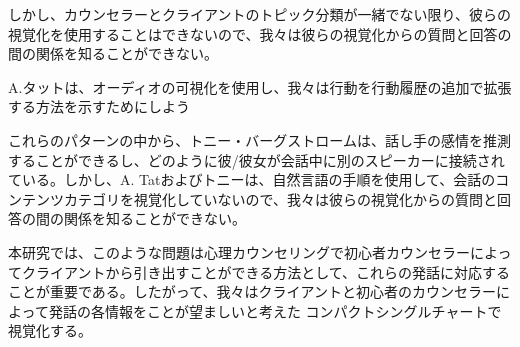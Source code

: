 \documentclass[shuuron]{kuee}
\begin{document}
しかし、カウンセラーとクライアントのトピック分類が一緒でない限り、彼らの視覚化を使用することはできないので、我々は彼らの視覚化からの質問と回答の間の関係を知ることができない。

  A.タット\cite{tat2002visualising}は、オーディオの可視化を使用し、我々は行動を行動履歴の追加で拡張する方法を示すためにしよう

 これらのパターンの中から、トニー・バーグストローム\cite{bergstrom2007seeing}は、話し手の感情を推測することができるし、どのように彼/彼女が会話中に別のスピーカーに接続されている。しかし、A. Tatおよびトニーは、自然言語の手順を使用して、会話のコンテンツカテゴリを視覚化していないので、我々は彼らの視覚化からの質問と回答の間の関係を知ることができない。

  本研究では、このような問題は心理カウンセリングで初心者カウンセラーによってクライアントから引き出すことができる方法として、これらの発話に対応することが重要である。したがって、我々はクライアントと初心者のカウンセラーによって発話の各情報をことが望ましいと考えた コンパクトシングルチャートで視覚化する。
\end{document}
